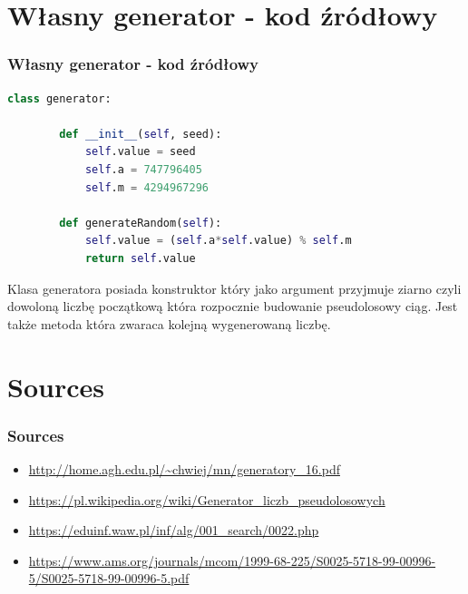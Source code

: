 \documentclass[9pt]{beamer}
\begin{document}
\section{Własny generator - kod źródłowy}
 \begin{frame}[containsverbatim]
  \frametitle{Własny generator - kod źródłowy}
   \begin{lstlisting}[language=Python, caption=Klasa generatora]
    class generator:

        def __init__(self, seed):
            self.value = seed
            self.a = 747796405
            self.m = 4294967296

        def generateRandom(self):
            self.value = (self.a*self.value) % self.m
            return self.value
    \end{lstlisting}
    Klasa generatora posiada konstruktor który jako argument przyjmuje ziarno czyli dowoloną liczbę początkową która rozpocznie budowanie pseudolosowy ciąg. Jest także metoda która zwaraca kolejną wygenerowaną liczbę.
\end{frame}
\section{Sources}
\begin{frame}
  \frametitle{Sources}
  \begin{itemize}
    \item \url{http://home.agh.edu.pl/~chwiej/mn/generatory_16.pdf}
    \item \url{https://pl.wikipedia.org/wiki/Generator_liczb_pseudolosowych}
    \item \url{https://eduinf.waw.pl/inf/alg/001_search/0022.php}
    \item \url{https://www.ams.org/journals/mcom/1999-68-225/S0025-5718-99-00996-5/S0025-5718-99-00996-5.pdf}
  \end{itemize}
\end{frame}
\end{document}
